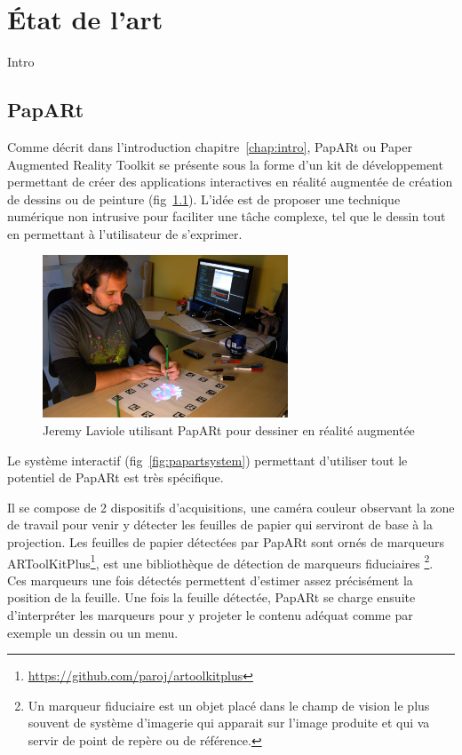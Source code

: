 \chapter{État de l'art}

Intro

\section{PapARt}
\label{sec:papart}
Comme décrit dans l'introduction chapitre~\ref{chap:intro}, PapARt ou Paper Augmented Reality Toolkit se présente sous la forme d'un kit de développement permettant de créer des applications interactives en réalité augmentée de création de dessins ou de peinture (fig~\ref{fig:papartdemo}). L'idée est de proposer une technique numérique non intrusive pour faciliter une tâche complexe, tel que le dessin tout en permettant à l'utilisateur de s'exprimer. %

\begin{figure}[H]
\centering
\includegraphics[width=0.65\textwidth]{images/papart-demo}
\caption{Jeremy Laviole utilisant PapARt pour dessiner en réalité augmentée\protect\footnotemark}
\label{fig:papartdemo}
\end{figure}

Le système interactif (fig~\ref{fig:papartsystem}) permettant d'utiliser tout le potentiel de PapARt est très spécifique. 

Il se compose de 2 dispositifs d'acquisitions, une caméra couleur observant la zone de travail pour venir y détecter les feuilles de papier qui serviront de base à la projection. Les feuilles de papier détectées par PapARt sont ornés de marqueurs ARToolKitPlus\footnote{\href{https://github.com/paroj/artoolkitplus}{https://github.com/paroj/artoolkitplus}}, est une bibliothèque de détection de marqueurs fiduciaires \footnote{Un marqueur fiduciaire est un objet placé dans le champ de vision le plus souvent de système d'imagerie qui apparait sur l'image produite et qui va servir de point de repère ou de référence.}. Ces marqueurs une fois détectés permettent d'estimer assez précisément la position de la feuille. Une fois la feuille détectée, PapARt se charge ensuite d'interpréter les marqueurs pour y projeter le contenu adéquat comme par exemple un dessin ou un menu.

